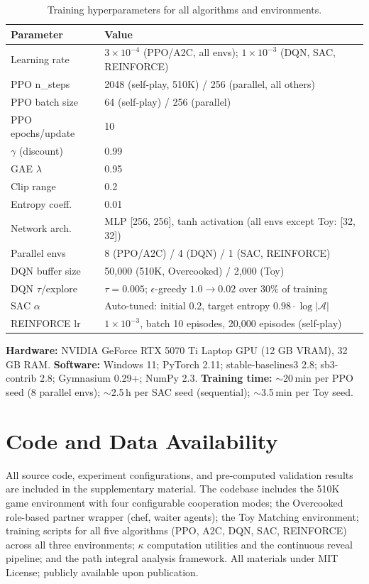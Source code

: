 \documentclass[letterpaper]{article}
\begin{document}
\begin{table}[h]
\centering
\footnotesize
\begin{tabular}{@{}lp{}@{}}
\toprule
Parameter & Value \\
\midrule
Learning rate     & $3 \times 10^{-4}$ (PPO/A2C, all envs); $1 \times 10^{-3}$ (DQN, SAC, REINFORCE) \\
PPO n\_steps      & 2048 (self-play, 510K) / 256 (parallel, all others) \\
PPO batch size    & 64 (self-play) / 256 (parallel) \\
PPO epochs/update & 10 \\
$\gamma$ (discount)& 0.99 \\
GAE $\lambda$     & 0.95 \\
Clip range        & 0.2 \\
Entropy coeff.    & 0.01 \\
Network arch.     & MLP [256, 256], tanh activation (all envs except Toy: [32, 32]) \\
Parallel envs     & 8 (PPO/A2C) / 4 (DQN) / 1 (SAC, REINFORCE) \\
DQN buffer size   & 50,000 (510K, Overcooked) / 2,000 (Toy) \\
DQN $\tau$/explore& $\tau=0.005$; $\epsilon$-greedy $1.0 \to 0.02$ over 30\% of training \\
SAC $\alpha$      & Auto-tuned: initial 0.2, target entropy $0.98 \cdot \log |\mathcal{A}|$ \\
REINFORCE lr      & $1 \times 10^{-3}$, batch 10 episodes, 20,000 episodes (self-play) \\
\bottomrule
\end{tabular}
\caption{Training hyperparameters for all algorithms and environments.}
\end{table}

\noindent\textbf{Hardware:} NVIDIA GeForce RTX 5070 Ti Laptop GPU (12 GB VRAM), 32 GB RAM. \textbf{Software:} Windows 11; PyTorch 2.11; stable-baselines3 2.8; sb3-contrib 2.8; Gymnasium 0.29+; NumPy 2.3. \textbf{Training time:} $\sim$20\,min per PPO seed (8 parallel envs); $\sim$2.5\,h per SAC seed (sequential); $\sim$3.5\,min per Toy seed.

\section{Code and Data Availability}

All source code, experiment configurations, and pre-computed validation results are included in the supplementary material. The codebase includes the 510K game environment with four configurable cooperation modes; the Overcooked role-based partner wrapper (chef, waiter agents); the Toy Matching environment; training scripts for all five algorithms (PPO, A2C, DQN, SAC, REINFORCE) across all three environments; $\kappa$ computation utilities and the continuous reveal pipeline; and the path integral analysis framework. All materials under MIT License; publicly available upon publication.
\end{document}
